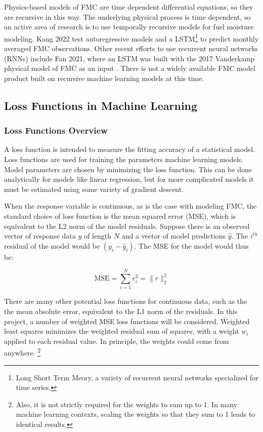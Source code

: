 \documentclass[11pt]{article}%
\begin{document}
Physics-based models of FMC are time dependent differential equations, so they are recursive in this way. The underlying physical process is time dependent, so an active area of research is to use temporally recursive models for fuel moisture modeling. Kang 2022 test autoregressive models and a LSTM\footnote{Long Short Term Meory, a variety of recurrent neural networks specialized for time series.} to predict monthly averaged FMC observations. \cite{Kang-2022-FMC} Other recent efforts to use recurrent neural networks (RNNs) include Fan 2021, where an LSTM was built with the 2017 Vanderkamp physical model of FMC as an input \cite{Fan-2021-PGD}. There is not a widely available FMC model product built on recursive machine learning models at this time.


\subsection{Loss Functions in Machine Learning}

\subsubsection{Loss Functions Overview}

A loss function is intended to measure the fitting accuracy of a statistical model. Loss functions are used for training the parameters machine learning models. Model parameters are chosen by minimizing the loss function. This can be done analytically for models like linear regression, but for more complicated models it must be estimated using some variety of gradient descent. 

When the response variable is continuous, as is the case with modeling FMC, the standard choice of loss function is the mean squared error (MSE), which is equivalent to the L2 norm of the model residuals. Suppose there is an observed vector of response data $y$ of length $N$ and a vector of model predictions $\hat y$. The $i^{th}$ residual of the model would be $(y_i - \hat y_i)$. The MSE for the model would thus be:

\[
\text{MSE} = \sum_{i=1}^N r_i^2 = \|r\|_2^2
\]

There are many other potential loss functions for continuous data, such as the the mean absolute error, equivalent to the L1 norm of the residuals. In this project, a number of weighted MSE loss functions will be considered. Weighted least squares minimizes the weighted residual sum of squares, with a weight $w_i$ applied to each residual value. In principle, the weights could come from anywhere. \footnote{Also, it is not strictly required for the weights to sum up to 1. In many machine learning contexts, scaling the weights so that they sum to 1 leads to identical results.}
\end{document}
